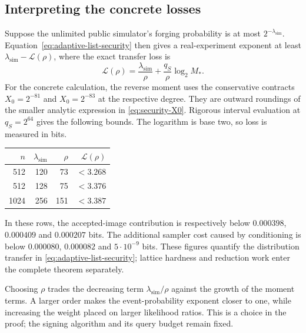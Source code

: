 \documentclass[11pt,a4paper]{article}
\theoremstyle{definition}
\theoremstyle{remark}
\numberwithin{equation}{section}
\begin{document}
\subsection{Interpreting the concrete losses}

Suppose the unlimited public simulator's forging probability is at most
$2^{-\lambda_{\mathrm{sim}}}$. Equation~\eqref{eq:adaptive-list-security}
then gives a real-experiment exponent at least
$\lambda_{\mathrm{sim}}-\mathcal L(\rho)$, where the exact transfer loss is
\begin{equation}
 \mathcal L(\rho)=\frac{\lambda_{\mathrm{sim}}}{\rho}
                    +\frac{q_S}{\rho}\log_2 M_*.
 \label{eq:transfer-bit-loss}
\end{equation}
For the concrete calculation, the reverse moment uses the conservative
contracts $X_0=2^{-81}$ and $X_0=2^{-83}$ at the respective degree. They
are outward roundings of the smaller analytic expression in
\eqref{eq:security-X0}. Rigorous interval evaluation at $q_S=2^{64}$
gives the following bounds. The logarithm is base two, so loss is measured
in bits.

\begin{center}
\begin{tabular}{rrrr}
\toprule
$n$ & $\lambda_{\mathrm{sim}}$ & $\rho$ & $\mathcal L(\rho)$\\
\midrule
512 & 120 & 73 & $<3.268$\\
512 & 128 & 75 & $<3.376$\\
1024 & 256 & 151 & $<3.387$\\
\bottomrule
\end{tabular}
\end{center}
In these rows, the accepted-image contribution is respectively below
$0.000398$, $0.000409$ and $0.000207$ bits. The additional sampler cost
caused by conditioning is below $0.000080$, $0.000082$ and
$5\cdot10^{-9}$ bits. These figures quantify the distribution transfer in
\eqref{eq:adaptive-list-security}; lattice hardness and reduction work enter
the complete theorem separately.

Choosing $\rho$ trades the decreasing term
$\lambda_{\mathrm{sim}}/\rho$ against the growth of the moment terms.
A larger order makes the event-probability exponent closer to one, while
increasing the weight placed on larger likelihood ratios. This is a choice
in the proof; the signing algorithm and its query budget remain fixed.
\end{document}
